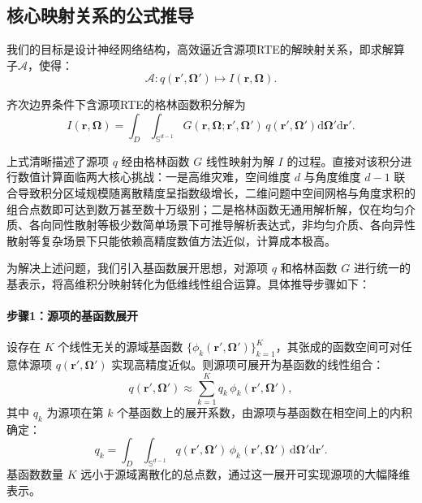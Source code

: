 \subsection{核心映射关系的公式推导}
我们的目标是设计神经网络结构，高效逼近含源项RTE的解映射关系，即求解算子$\mathcal{A}$，使得：
\begin{equation}
    \mathcal{A}: q(\boldsymbol{r}',\boldsymbol{\Omega}') \mapsto I(\boldsymbol{r},\boldsymbol{\Omega}).
\end{equation}

齐次边界条件下含源项RTE的格林函数积分解为
\begin{equation}\label{eq:green-core}
    I(\boldsymbol{r},\boldsymbol{\Omega})
    = \int_{D}\int_{\mathbb{S}^{d-1}} G(\boldsymbol{r},\boldsymbol{\Omega};\boldsymbol{r}',\boldsymbol{\Omega}')\, q(\boldsymbol{r}',\boldsymbol{\Omega}')\mathrm{d}\boldsymbol{\Omega}'\mathrm{d}\boldsymbol{r}'.
\end{equation}

上式清晰描述了源项 $q$ 经由格林函数 $G$ 线性映射为解 $I$ 的过程。直接对该积分进行数值计算面临两大核心挑战：一是高维灾难，空间维度 $d$ 与角度维度 $d-1$ 联合导致积分区域规模随离散精度呈指数级增长，二维问题中空间网格与角度求积的组合点数即可达到数万甚至数十万级别；二是格林函数无通用解析解，仅在均匀介质、各向同性散射等极少数简单场景下可推导解析表达式，非均匀介质、各向异性散射等复杂场景下只能依赖高精度数值方法近似，计算成本极高。

为解决上述问题，我们引入基函数展开思想，对源项 $q$ 和格林函数 $G$ 进行统一的基表示，将高维积分映射转化为低维线性组合运算。具体推导步骤如下：

\paragraph{步骤1：源项的基函数展开}
设存在 $K$ 个线性无关的源域基函数 $\{\phi_k(\boldsymbol{r}',\boldsymbol{\Omega}')\}_{k=1}^K$，其张成的函数空间可对任意体源项 $q(\boldsymbol{r}',\boldsymbol{\Omega}')$ 实现高精度近似。则源项可展开为基函数的线性组合：
\begin{equation}\label{eq:q-expand}
    q(\boldsymbol{r}',\boldsymbol{\Omega}') \approx \sum_{k=1}^{K} q_k\, \phi_k(\boldsymbol{r}',\boldsymbol{\Omega}'),
\end{equation}
其中 $q_k$ 为源项在第 $k$ 个基函数上的展开系数，由源项与基函数在相空间上的内积确定：
\begin{equation}\label{eq:q-coeff}
    q_k = \int_{D}\int_{\mathbb{S}^{d-1}} q(\boldsymbol{r}',\boldsymbol{\Omega}')\, \phi_k(\boldsymbol{r}',\boldsymbol{\Omega}')\,\mathrm{d}\boldsymbol{\Omega}'\mathrm{d}\boldsymbol{r}'.
\end{equation}
基函数数量 $K$ 远小于源域离散化的总点数，通过这一展开可实现源项的大幅降维表示。

